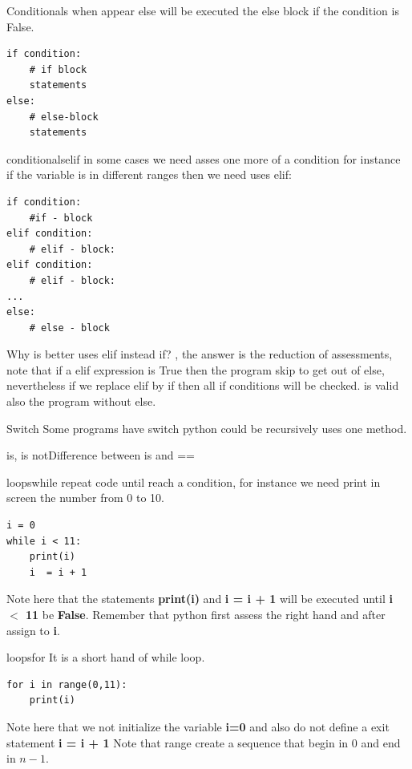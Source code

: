 \documentclass{beamer}
\begin{document}
\begin{frame}[fragile]{Conditionals}{}
when appear else will be executed the else block if the condition is False.
\begin{lstlisting}
if condition:
	# if block
	statements
else:
	# else-block
	statements 
\end{lstlisting}
\end{frame}



\begin{frame}[fragile]{conditionals}{elif}
in some cases we need asses one more of a condition for instance if the variable is in different ranges then we need uses elif:
\begin{lstlisting}
if condition:
	#if - block 
elif condition:
	# elif - block:
elif condition:
	# elif - block:
...
else:
	# else - block

\end{lstlisting}
Why is better uses elif instead if? , the answer is the reduction of assessments, note that if a elif expression  is True then the program skip to get out of else, nevertheless if we replace elif by if then all if conditions will be checked. is valid also the program without else.
\end{frame}



\begin{frame}[fragile]{Switch}
Some programs have switch python could be recursively uses one method.

\end{frame}


\begin{frame}{is, is not}{Difference between is and ==}


\end{frame}



\begin{frame}[fragile]{loops}{while}
repeat code until reach a condition, for instance we need print in screen the number from 0 to 10.
\begin{lstlisting}
i = 0 
while i < 11:
	print(i)
	i  = i + 1
\end{lstlisting}
Note here that the statements \textbf{print(i)} and \textbf{i = i + 1 } will be executed until \textbf{i $<$ 11 } be  \textbf{False}.
Remember that python first assess the right hand and after assign  to \textbf{i}.
\end{frame}


\begin{frame}[fragile]{loops}{for}
It is a short hand of while loop.
\begin{lstlisting}
for i in range(0,11):
	print(i)
\end{lstlisting}
Note here that we not initialize the variable \textbf{i=0} and also do not define a exit statement \textbf{i = i + 1 }
Note that range create a sequence that begin in 0 and end in $n-1$.
\end{frame}
\end{document}
